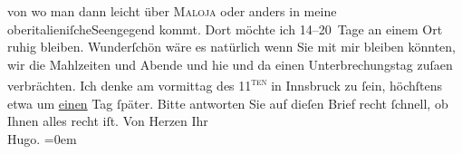 \begin{ledgroupsized}[t]{13cm}
                    von wo man dann leicht über \textsc{Maloja} oder anders {\pb}in meine oberitalieniſcheSeengegend kommt. Dort möchte ich 14–20 Tage an einem Ort ruhig bleiben.
                    Wunderſchön wäre es natürlich wenn Sie mit mir bleiben könnten, wir die
                    Mahlzeiten und Abende und hie und da einen Unterbrechungstag {\pb}zuſa{\geminationm}en verbrächten.\pend
           \pstart
           Ich denke am vormittag des 11\textsuperscript{\textsc{ten}} in Innsbruck zu ſein, höchſtens etwa um
                        \uline{einen} Tag ſpäter. Bitte antworten Sie auf
                    dieſen Brief recht ſchnell, ob Ihnen alles recht iſt.\pend
           \pstart
           Von Herzen Ihr{\\[\baselineskip]}\spacefill\mbox{Hugo.}\pend
           \leftskip=0em{}
         
         \endnumbering{}\end{ledgroupsized}  \newcommand{\dateiname}{L00829}\newcommand{\titel}{Hugo von Hofmannsthal an Arthur Schnitzler, 3. 8. [1898]}\newcommand{\editorInnen}{Martin Anton Müller und Gerd-Hermann Susen}
      